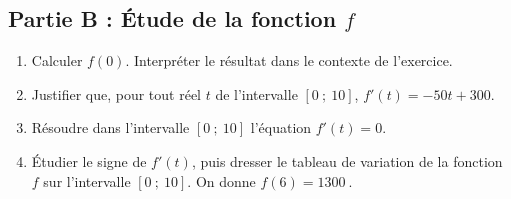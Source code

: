\documentclass[10pt]{article}
\providecommand{\np}[2][]{{#2~#1}}
\begin{document}
\subsection*{Partie B : Étude de la fonction $f$}

\begin{enumerate}
	\item Calculer $f(0)$. Interpréter le résultat dans le contexte de l'exercice.
	\item Justifier que, pour tout réel $t$ de l'intervalle $[0~;~10]$, $f'(t) = -50t + 300$.
	\item Résoudre dans l'intervalle $[0~;~10]$ l'équation $f'(t)=0$.
	\item Étudier le signe de $f'(t)$, puis dresser le tableau de variation de la fonction $f$ sur l'intervalle $[0~;~10]$. On donne $f(6)=\np{1300}$.
\end{enumerate}
\end{document}

